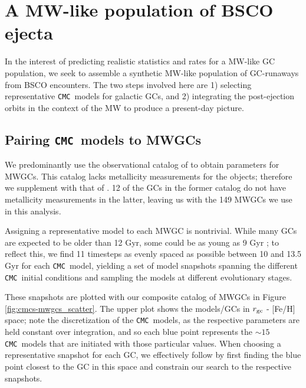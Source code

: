 \documentclass[twocolumn]{aastex631}
\newcommand{\CMC}{\texttt{CMC}}
\begin{document}
\section{A MW-like population of BSCO ejecta} \label{sec:est_MW-like}

In the interest of predicting realistic statistics and rates for a MW-like GC population, we seek to assemble a synthetic MW-like population of GC-runaways from BSCO encounters.
The two steps involved here are 1) selecting representative \CMC\ models for galactic GCs, and 2) integrating the post-ejection orbits in the context of the MW to produce a present-day picture.

\subsection{Pairing \CMC\ models to MWGCs} \label{subsec:pairing}

We predominantly use the observational catalog of \citet{2018MNRAS.478.1520B} to obtain parameters for MWGCs.
This catalog lacks metallicity measurements for the objects; therefore we supplement with that of \citet{2010arXiv1012.3224H}.
12 of the GCs in the former catalog do not have metallicity measurements in the latter, leaving us with the 149 MWGCs we use in this analysis.

Assigning a representative model to each MWGC is nontrivial.
While many GCs are expected to be older than 12 Gyr, some could be as young as 9 Gyr \citep{2013ApJ...775..134V}; to reflect this, we find 11 timesteps as evenly spaced as possible between 10 and 13.5 Gyr for each \CMC\ model, yielding a set of model snapshots spanning the different \CMC\ initial conditions and sampling the models at different evolutionary stages.

These snapshots are plotted with our composite catalog of MWGCs in Figure \ref{fig:cmcs-mwgcs_scatter}.
The upper plot shows the models/GCs in $r_{\rm gc}$ - [Fe/H] space; note the discretization of the \CMC\ models, as the respective parameters are held constant over integration, and so each blue point represents the $\sim 15$ \CMC\ models that are initiated with those particular values.
When choosing a representative snapshot for each GC, we effectively follow \citet{2021ApJ...912..102R} by first finding the blue point closest to the GC in this space and constrain our search to the respective snapshots.
\end{document}
